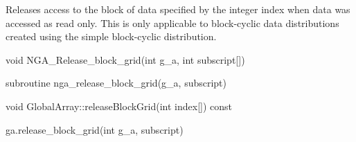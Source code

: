 \documentclass[12pt]{article}
\begin{document}
\local

\begin{desc}

Releases access to the block of data specified by the integer index when data
was accessed as read only. This is only applicable to block-cyclic data
distributions created using the simple block-cyclic distribution.

\end{desc}



\begin{capi}
\begin{ccode}
void NGA_Release_block_grid(int g_a, int subscript[])
\end{ccode}
\begin{funcargs}
\end{funcargs}
\end{capi}

\begin{fapi}
\begin{fcode}
subroutine nga_release_block_grid(g_a, subscript)
\end{fcode}
\begin{funcargs}
\end{funcargs}
\end{fapi}

\begin{cxxapi}
\begin{cxxcode}
void GlobalArray::releaseBlockGrid(int index[]) const
\end{cxxcode}
\begin{funcargs}
\end{funcargs}
\end{cxxapi}

\begin{pyapi}
\begin{pycode}
ga.release_block_grid(int g_a, subscript)
\end{pycode}
\begin{funcargs}
\end{funcargs}
\end{pyapi}
\end{document}
